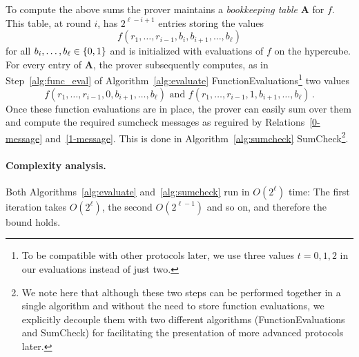 To compute the above sums the prover maintains a \emph{bookkeeping table} $\textbf{A}$ for $f$. This table, at round $i$, has $2^{\ell-i+1}$ entries storing the values $$f(r_1,\ldots, r_{i-1}, b_{i}, b_{i+1},\ldots, b_{\ell})$$ for all $b_i,\ldots,b_\ell\in\{0,1\}$ and is initialized with evaluations of $f$ on the hypercube. For every entry of $\textbf{A}$, the prover subsequently computes, as in Step~\ref{alg:func_eval} of Algorithm~\ref{alg:evaluate} \textsf{FunctionEvaluations}\footnote{To be compatible with other protocols later, we use three values $t=0,1,2$ in our evaluations instead of just two.}  two values 
$$
f(r_1,\ldots, r_{i-1}, 0, b_{i+1},\ldots, b_{\ell}) 
\text{ and } f(r_1,\ldots, r_{i-1}, 1, b_{i+1},\ldots, b_{\ell})\,.$$
Once these function evaluations are in place, the prover can easily sum over them and compute the required sumcheck messages as reguired by Relations~\ref{0-message} and~\ref{1-message}. This is done in Algorithm~\ref{alg:sumcheck} \textsf{SumCheck}\footnote{We note here that although these two steps  can be performed together in a single algorithm and without the need to store function evaluations, we explicitly decouple them with two different algorithms (\textsf{FunctionEvaluations} and \textsf{SumCheck}) for facilitating the presentation of more advanced protocols later. }. 

\paragraph{Complexity analysis.} 
Both Algorithms~\ref{alg:evaluate} and~\ref{alg:sumcheck} run in $O(2^\ell)$ time: The first iteration takes $O(2^\ell)$, the second $O(2^{\ell-1})$ and so on, and therefore the bound holds. 






